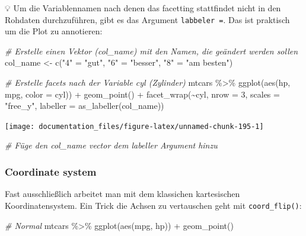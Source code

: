 \documentclass[
]{article}
\newenvironment{Shaded}{\begin{snugshade}}{\end{snugshade}}
\newcommand{\AttributeTok}[1]{\textcolor[rgb]{0.77,0.63,0.00}{#1}}
\newcommand{\CommentTok}[1]{\textcolor[rgb]{0.56,0.35,0.01}{\textit{#1}}}
\newcommand{\DecValTok}[1]{\textcolor[rgb]{0.00,0.00,0.81}{#1}}
\newcommand{\FunctionTok}[1]{\textcolor[rgb]{0.00,0.00,0.00}{#1}}
\newcommand{\NormalTok}[1]{#1}
\newcommand{\OtherTok}[1]{\textcolor[rgb]{0.56,0.35,0.01}{#1}}
\newcommand{\SpecialCharTok}[1]{\textcolor[rgb]{0.00,0.00,0.00}{#1}}
\newcommand{\StringTok}[1]{\textcolor[rgb]{0.31,0.60,0.02}{#1}}
\begin{document}
💡 Um die Variablennamen nach denen das facetting stattfindet nicht in den Rohdaten durchzuführen, gibt es das Argument \texttt{labbeler\ =}. Das ist praktisch um die Plot zu annotieren:

\begin{Shaded}
\begin{Highlighting}[]
\CommentTok{\# Erstelle einen Vektor (col\_name) mit den Namen, die geändert werden sollen}
\NormalTok{col\_name }\OtherTok{\textless{}{-}} \FunctionTok{c}\NormalTok{(}\StringTok{"4"} \OtherTok{=} \StringTok{"gut"}\NormalTok{, }\StringTok{"6"} \OtherTok{=} \StringTok{"besser"}\NormalTok{, }\StringTok{"8"} \OtherTok{=} \StringTok{"am besten"}\NormalTok{)}

\CommentTok{\# Erstelle facets nach der Variable cyl (Zylinder)}
\NormalTok{mtcars }\SpecialCharTok{\%\textgreater{}\%}
  \FunctionTok{ggplot}\NormalTok{(}\FunctionTok{aes}\NormalTok{(hp, mpg, }\AttributeTok{color =}\NormalTok{ cyl)) }\SpecialCharTok{+}
  \FunctionTok{geom\_point}\NormalTok{() }\SpecialCharTok{+}
  \FunctionTok{facet\_wrap}\NormalTok{(}\SpecialCharTok{\textasciitilde{}}\NormalTok{cyl, }\AttributeTok{nrow =} \DecValTok{3}\NormalTok{, }\AttributeTok{scales =} \StringTok{"free\_y"}\NormalTok{, }\AttributeTok{labeller =} \FunctionTok{as\_labeller}\NormalTok{(col\_name)) }
\end{Highlighting}
\end{Shaded}

\begin{center}\texttt{[image: documentation\_files/figure-latex/unnamed-chunk-195-1]} \end{center}

\begin{Shaded}
\begin{Highlighting}[]
\CommentTok{\# Füge den col\_name vector dem labeller Argument hinzu}
\end{Highlighting}
\end{Shaded}

\hypertarget{coordinate-system}{%
\subsubsection{Coordinate system}\label{coordinate-system}}

Fast ausschließlich arbeitet man mit dem klassichen kartesischen Koordinatensystem. Ein Trick die Achsen zu vertauschen geht mit \texttt{coord\_flip()}:

\begin{Shaded}
\begin{Highlighting}[]
\CommentTok{\# Normal}
\NormalTok{mtcars }\SpecialCharTok{\%\textgreater{}\%}
  \FunctionTok{ggplot}\NormalTok{(}\FunctionTok{aes}\NormalTok{(mpg, hp)) }\SpecialCharTok{+}
  \FunctionTok{geom\_point}\NormalTok{()}
\end{Highlighting}
\end{Shaded}
\end{document}
